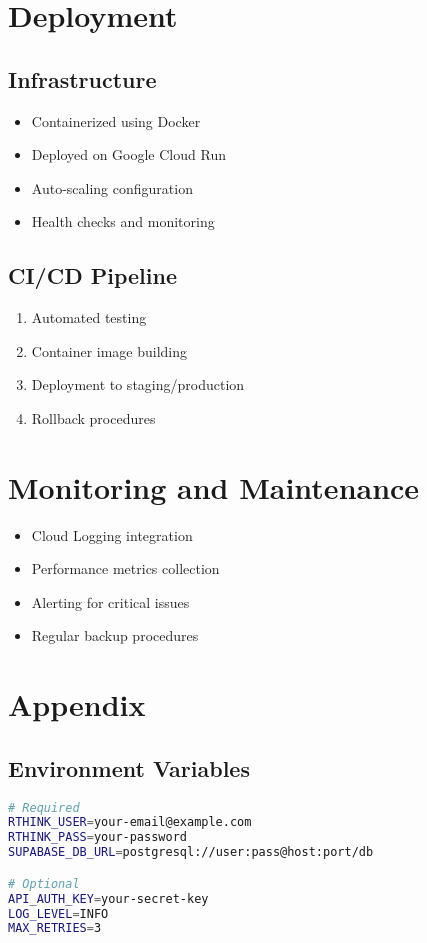 \documentclass[11pt,a4paper]{article}
\begin{document}
\section{Deployment}
\subsection{Infrastructure}
\begin{itemize}
    \item Containerized using Docker
    \item Deployed on Google Cloud Run
    \item Auto-scaling configuration
    \item Health checks and monitoring
\end{itemize}

\subsection{CI/CD Pipeline}
\begin{enumerate}
    \item Automated testing
    \item Container image building
    \item Deployment to staging/production
    \item Rollback procedures
\end{enumerate}

\section{Monitoring and Maintenance}
\begin{itemize}
    \item Cloud Logging integration
    \item Performance metrics collection
    \item Alerting for critical issues
    \item Regular backup procedures
\end{itemize}

\section{Appendix}
\subsection{Environment Variables}
\begin{lstlisting}[language=bash]
# Required
RTHINK_USER=your-email@example.com
RTHINK_PASS=your-password
SUPABASE_DB_URL=postgresql://user:pass@host:port/db

# Optional
API_AUTH_KEY=your-secret-key
LOG_LEVEL=INFO
MAX_RETRIES=3
\end{lstlisting}
\end{document}
